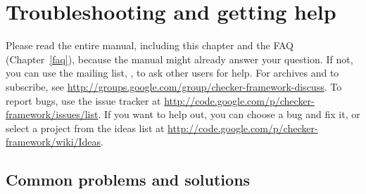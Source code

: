 \htmlhr
\chapter{Troubleshooting and getting help\label{troubleshooting}}

Please read the entire manual, including this chapter and the FAQ
(Chapter~\ref{faq}), because the manual might already answer your question.
If not, you can use the mailing list,
, to ask other users for
help.  For archives and to subscribe, see \url{http://groups.google.com/group/checker-framework-discuss}.
To report bugs, use the issue tracker at
\url{http://code.google.com/p/checker-framework/issues/list}.
If you want to help out, you can choose a bug and fix it, or select a
project from the ideas list at
\url{http://code.google.com/p/checker-framework/wiki/Ideas}.


\section{Common problems and solutions\label{common-problems}}

